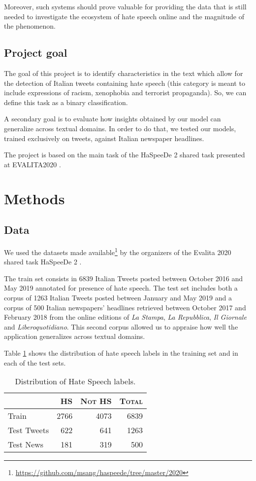 \documentclass[a4paper, 9pt, twocolumn, DIV=calc]{scrartcl}
\begin{document}
Moreover, such systems should prove valuable for providing the data that is still needed to investigate the ecosystem of hate speech online and the magnitude of the phenomenon.
\subsection{Project goal}
The goal of this project is to identify characteristics in the text which allow for the detection of Italian tweets containing hate speech (this category is meant to include expressions of racism, xenophobia and terrorist propaganda).
So, we can define this task as a binary classification.

A secondary goal is to evaluate how insights obtained by our model can generalize across textual domains. In order to do that, we tested our models, trained exclusively on tweets, against Italian newspaper headlines.

The project is based on the main task of the HaSpeeDe 2 shared task presented at EVALITA2020 \cite{haspeede2}.

\section{Methods}
\subsection{Data}
We used the datasets made available\footnote{\url{https://github.com/msang/haspeede/tree/master/2020}} by the organizers of the Evalita 2020 shared task HaSpeeDe 2 \cite{haspeede2}.

The train set consists in 6839 Italian Tweets posted between October 2016 and May 2019 annotated for presence of hate speech.
The test set includes both a corpus of 1263 Italian Tweets posted between January and May 2019 and a corpus of 500 Italian newspapers' headlines retrieved between October 2017 and February 2018 from the online editions of \emph{La Stampa}, \emph{La Repubblica}, \emph{Il Giornale} and \emph{Liberoquotidiano}.
This second corpus allowed us to appraise how well the application generalizes across textual domains.

Table \ref{tbl:class_composition} shows the distribution of hate speech labels in the training set and in each of the test sets.

\begin{table}
\centering
    \begin{tabular}{lrrr}
        \toprule
        & \textsc{HS} & \textsc{Not HS} & \textsc{Total} \\
        \midrule
        Train & 2766 & 4073 & 6839 \\
        \midrule
        Test Tweets & 622 & 641 & 1263 \\
        Test News & 181 & 319 & 500 \\
        \bottomrule
    \end{tabular}
    \caption{Distribution of Hate Speech labels.}
    \label{tbl:class_composition}
\end{table}
\end{document}
